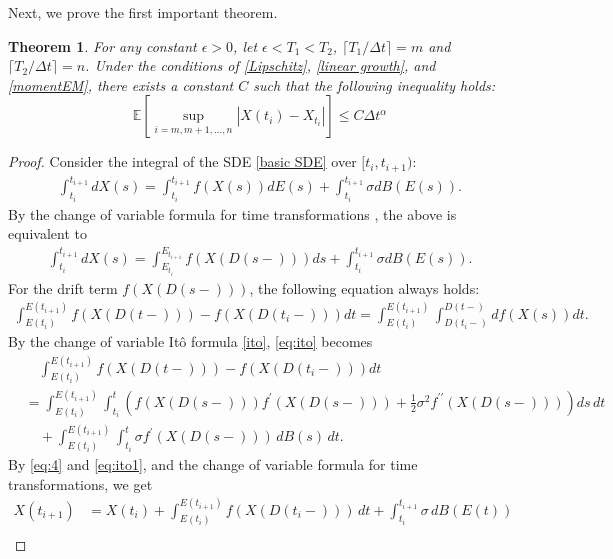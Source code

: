\documentclass[10pt,reqno,final]{amsart}
\theoremstyle{plain}
\newtheorem{theorem}{Theorem}[section]
\theoremstyle{definition}
\theoremstyle{remark}
\numberwithin{equation}{section}
\numberwithin{figure}{section}
\numberwithin{table}{section}
\begin{document}
Next, we prove the first important theorem.
\begin{theorem}\label{main th EM}
	For any constant $\epsilon > 0$, let $\epsilon < T_1 < T_2$, $\lceil T_1 / \Delta t \rceil = m$ and $\lceil T_2 / \Delta t \rceil = n$. Under the conditions of \textnormal{\cref{Lipschitz}}, \textnormal{\cref{linear growth}}, and \textnormal{\cref{momentEM}}, there exists a constant $C$ such that the following inequality holds:
	$$\mathbb{E}\left[\sup\limits_{i = m, m+1, \ldots, n} |X({t_i}) - X_{t_i}|\right] \leq C\Delta t^\alpha$$
\end{theorem}

\begin{proof}
	Consider the integral of the SDE \eqref{basic SDE} over $[t_i, t_{i+1})$:
	\begin{align}
		\int_{t_i}^{t_{i+1}}dX(s)=\int_{t_i}^{t_{i+1}}f(X(s))dE(s)+\int_{t_i}^{t_{i+1}}\sigma dB(E(s)). 
	\end{align}
	By the change of variable formula for time transformations \cite{kobayashi2011stochastic}, the above is equivalent to
	\begin{align}\label{eq:4}
		\int_{t_i}^{t_{i+1}}dX(s)=\int_{E_{t_i}}^{E_{t_{i+1}}}f(X(D(s-)))ds+\int_{t_i}^{t_{i+1}}\sigma dB(E(s)). 
	\end{align}
	For the drift term $f(X(D(s-)))$, the following equation always holds:
	\begin{align}\label{eq:ito}
		\int_{E(t_i)}^{E(t_{i+1})} f(X(D(t-))) - f(X(D(t_i-))) dt = \int_{E(t_i)}^{E(t_{i+1})} \int^{D(t-)}_{D(t_i-)} df(X(s)) dt. 
	\end{align}
	By the change of variable Itô formula \cref{ito}, \eqref{eq:ito} becomes
	\begin{equation}\label{eq:ito1}
		\begin{aligned}
			&\quad\int_{E(t_i)}^{E(t_{i+1})} f(X(D(t-))) - f(X(D(t_i-))) dt \\
			&= \int_{E(t_i)}^{E(t_{i+1})} \int_{t_i}^{t} \left( f(X(D(s-))) f^{\prime}(X(D(s-))) + \frac{1}{2} \sigma^2 f^{\prime\prime}(X(D(s-))) \right) ds \, dt\\
			&\quad + \int_{E(t_i)}^{E(t_{i+1})} \int_{t_i}^{t} \sigma f^{\prime}(X(D(s-))) \, dB(s) \, dt . 
		\end{aligned}
	\end{equation}
	By \eqref{eq:4} and \eqref{eq:ito1}, and the change of variable formula for time transformations, we get
	\begin{align*}
		X(t_{i+1}) 
		&= X(t_i) + \int_{E(t_i)}^{E(t_{i+1})} f(X({D(t_i-)})) \, dt + \int_{t_i}^{t_{i+1}} \sigma \, dB(E(t)) \\

\end{align*}
\end{proof}
\end{document}
